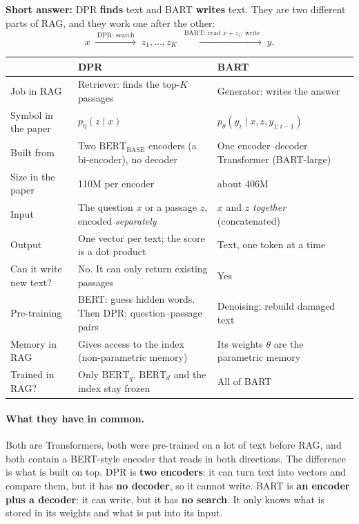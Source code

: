 \documentclass[11pt]{article}
\begin{document}
\textbf{Short answer:} DPR \textbf{finds} text and BART \textbf{writes} text. They are two different parts of RAG, and they work one after the other:
\begin{equation*}
  x \;\xrightarrow{\ \text{DPR: search}\ }\; z_1, \dots, z_K \;\xrightarrow{\ \text{BART: read } x + z_i,\ \text{write}\ }\; y .
\end{equation*}

\begin{center}
\begin{tabularx}{\textwidth}{@{}l Y Y@{}}
\toprule
 & \textbf{DPR} & \textbf{BART} \\
\midrule
Job in RAG & Retriever: finds the top-$K$ passages & Generator: writes the answer \\
\addlinespace
Symbol in the paper & $p_\eta(z \mid x)$ & $p_\theta(y_i \mid x, z, y_{1:i-1})$ \\
\addlinespace
Built from & Two $\text{BERT}_{\text{BASE}}$ encoders (a bi-encoder), no decoder & One encoder--decoder Transformer (BART-large) \\
\addlinespace
Size in the paper & 110M per encoder & about 406M \\
\addlinespace
Input & The question $x$ or a passage $z$, encoded \emph{separately} & $x$ and $z$ \emph{together} (concatenated) \\
\addlinespace
Output & One vector per text; the score is a dot product & Text, one token at a time \\
\addlinespace
Can it write new text? & No. It can only return existing passages & Yes \\
\addlinespace
Pre-training & BERT: guess hidden words. Then DPR: question--passage pairs & Denoising: rebuild damaged text \\
\addlinespace
Memory in RAG & Gives access to the index (non-parametric memory) & Its weights $\theta$ are the parametric memory \\
\addlinespace
Trained in RAG? & Only $\mathrm{BERT}_q$. $\mathrm{BERT}_d$ and the index stay frozen & All of BART \\
\bottomrule
\end{tabularx}
\end{center}

\paragraph{What they have in common.}
Both are Transformers, both were pre-trained on a lot of text before RAG, and both contain a BERT-style encoder that reads in both directions. The difference is what is built on top. DPR is \textbf{two encoders}: it can turn text into vectors and compare them, but it has \textbf{no decoder}, so it cannot write. BART is \textbf{an encoder plus a decoder}: it can write, but it has \textbf{no search}. It only knows what is stored in its weights and what is put into its input.
\end{document}
